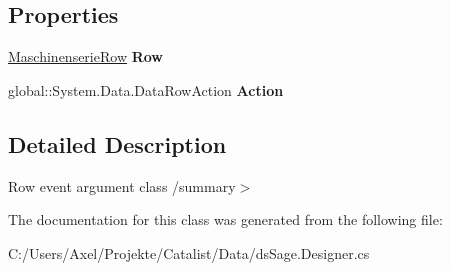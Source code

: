 \subsection*{Properties}
\begin{DoxyCompactItemize}
\item 
\hyperlink{class_products_1_1_data_1_1ds_sage_1_1_maschinenserie_row}{Maschinenserie\+Row} {\bfseries Row}\hypertarget{class_products_1_1_data_1_1ds_sage_1_1_maschinenserie_row_change_event_af63d929bdf7891c52a123682389f2e2b}{}\label{class_products_1_1_data_1_1ds_sage_1_1_maschinenserie_row_change_event_af63d929bdf7891c52a123682389f2e2b}

\item 
global\+::\+System.\+Data.\+Data\+Row\+Action {\bfseries Action}\hypertarget{class_products_1_1_data_1_1ds_sage_1_1_maschinenserie_row_change_event_a5d8ef2ebcdff37ef004834b6e8f02ee4}{}\label{class_products_1_1_data_1_1ds_sage_1_1_maschinenserie_row_change_event_a5d8ef2ebcdff37ef004834b6e8f02ee4}

\end{DoxyCompactItemize}


\subsection{Detailed Description}
Row event argument class /summary$>$ 

The documentation for this class was generated from the following file\+:\begin{DoxyCompactItemize}
\item 
C\+:/\+Users/\+Axel/\+Projekte/\+Catalist/\+Data/ds\+Sage.\+Designer.\+cs\end{DoxyCompactItemize}
